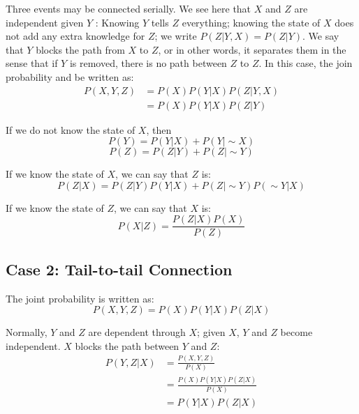 \begin{multicols}{2}
\noindent Three events may be connected serially. We see here that $X$ and $Z$ are independent given $Y$ : Knowing $Y$ tells $Z$ everything; knowing the state of $X$ does not add any extra knowledge for $Z$; we write $P(Z|Y,X) = P(Z|Y)$. We say that $Y$ blocks the path from $X$ to $Z$, or in other words, it separates them in the sense that if $Y$ is removed, there is no path between $Z$ to $Z$. In this case, the join probability and be written as:
\begin{equation*}
\begin{split}
    P(X,Y,Z) &= P(X) P(Y|X) P(Z|Y,X)\\
    &= P(X) P(Y|X) P(Z|Y)
\end{split}
\end{equation*}

\noindent If we do not know the state of $X$, then
$$P(Y) = P(Y|X) + P(Y|\sim X)$$
$$P(Z) = P(Z|Y) + P(Z|\sim Y)$$

\noindent If we know the state of $X$, we can say that $Z$ is:
$$P(Z|X) = P(Z|Y)P(Y|X)+P(Z|\sim Y)P(\sim Y|X)$$

\noindent If we know the state of $Z$, we can say that $X$ is:
$$P(X|Z) = \frac{P(Z|X)P(X)}{P(Z)}$$

\subsection{Case 2: Tail-to-tail Connection}

\begin{center}
\end{center}

\noindent The joint probability is written as:
$$P(X,Y,Z) = P(X) P(Y|X) P(Z|X)$$

\noindent Normally, $Y$ and $Z$ are dependent through $X$; given $X$, $Y$ and $Z$ become independent. $X$ blocks the path between $Y$ and $Z$:
\begin{equation*}
\begin{split}
    P(Y,Z|X) &= \frac{P(X,Y,Z)}{P(X)} \\
    &= \frac{P(X) P(Y|X) P(Z|X)}{P(X)} \\
    &= P(Y|X) P(Z|X)
\end{split}
\end{equation*}


\end{multicols}
